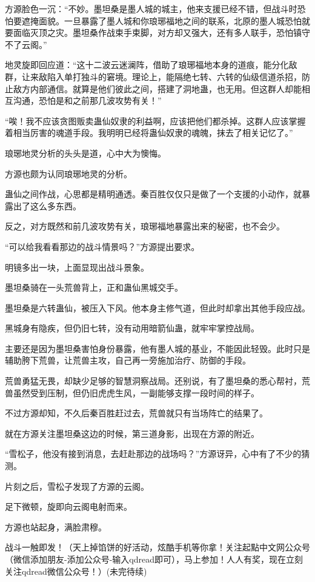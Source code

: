\begin{this_body}
方源脸色一沉：“不妙。墨坦桑是墨人城的城主，他来支援已经不错，但战斗时恐怕要遮掩面貌。一旦暴露了墨人城和你琅琊福地之间的联系，北原的墨人城恐怕就要面临灭顶之灾。墨坦桑作战束手束脚，对方却又强大，还有多人联手，恐怕镇守不了云阁。”

地灵旋即回应道：“这十二波云迷澜阵，借助了琅琊福地本身的道痕，能分化敌群，让来敌陷入单打独斗的窘境。理论上，能隔绝七转、六转的仙级信道杀招，防止敌方内部通信。就算是他们彼此之间，搭建了洞地蛊，也无用。但这群人却能相互沟通，恐怕是和之前那几波攻势有关！”

“唉！我不应该贪图贩卖蛊仙奴隶的利益啊，应该把他们都杀掉。这群人应该掌握着相当厉害的魂道手段。我明明已经将蛊仙奴隶的魂魄，抹去了相关记忆了。”

琅琊地灵分析的头头是道，心中大为懊悔。

方源也颇为认同琅琊地灵的分析。

蛊仙之间作战，心思都是精明通透。秦百胜仅仅只是做了一个支援的小动作，就暴露出了这么多东西。

反之，对方既然和前几波攻势有关，琅琊福地暴露出来的秘密，也不会少。

“可以给我看看那边的战斗情景吗？”方源提出要求。

明镜多出一块，上面显现出战斗景象。

墨坦桑骑在一头荒兽背上，正和蛊仙黑城交手。

墨坦桑是六转蛊仙，被压入下风。他本身主修气道，但此时却拿出其他手段应战。

黑城身有隐疾，但仍旧七转，没有动用暗箭仙蛊，就牢牢掌控战局。

主要还是因为墨坦桑害怕身份暴露，他有墨人城的基业，不能因此轻毁。此时只是辅助胯下荒兽，让荒兽主攻，自己再一旁施加治疗、防御的手段。

荒兽勇猛无畏，却缺少足够的智慧洞察战局。还别说，有了墨坦桑的悉心帮衬，荒兽虽然受到压制，但仍旧虎虎生风，一副能够支撑一段时间的样子。

不过方源却知，不久后秦百胜赶过去，荒兽就只有当场阵亡的结果了。

就在方源关注墨坦桑这边的时候，第三道身影，出现在方源的附近。

“雪松子，他没有接到消息，去赶赴那边的战场吗？”方源讶异，心中有了不少的猜测。

片刻之后，雪松子发现了方源的云阁。

足下微顿，旋即向云阁电射而来。

方源也站起身，满脸肃穆。

战斗一触即发！（天上掉馅饼的好活动，炫酷手机等你拿！关注起點中文网公众号（微信添加朋友-添加公众号-输入qdread即可），马上参加！人人有奖，现在立刻关注qdread微信公众号！）(未完待续)

\end{this_body}

